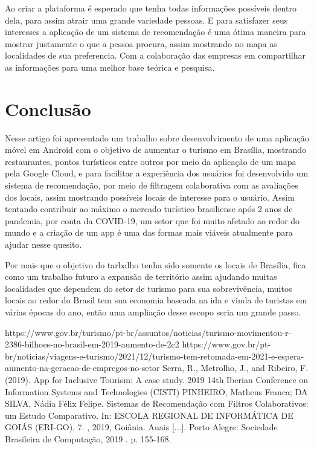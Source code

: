 \documentclass[conference]{IEEEtran}
\begin{document}
Ao criar a plataforma é esperado que tenha todas informações possíveis dentro dela, para assim atrair uma grande variedade pessoas. E para satisfazer seus interesses a aplicação de um sistema de recomendação é uma ótima maneira para mostrar justamente o que a pessoa procura, assim mostrando no mapa as localidades de sua preferencia. Com a colaboração das empresas em compartilhar as informações para uma melhor base teórica e pesquisa.

\section{Conclusão}
Nesse artigo foi apresentado um trabalho sobre desenvolvimento de uma aplicação móvel em Android com o objetivo de aumentar o turismo em Brasília, mostrando restaurantes, pontos turísticos entre outros por meio da aplicação de um mapa pela Google Cloud, e para facilitar a experiência dos usuários foi desenvolvido um sistema de recomendação, por meio de filtragem colaborativa com as avaliações dos locais, assim mostrando possíveis locais de interesse para o usuário. Assim tentando contribuir ao máximo o mercado turístico brasiliense após 2 anos de pandemia, por conta da COVID-19, um setor que foi muito afetado ao redor do mundo e a criação de um app é uma das formas mais viáveis atualmente para ajudar nesse quesito.

Por mais que o objetivo do tarbalho tenha sido somente os locais de Brasília, fica como um trabalho futuro a expansão de território assim ajudando muitas localidades que dependem do setor de turismo para sua sobrevivência, muitos locais ao redor do Brasil tem sua economia baseada na ida e vinda de turistas em várias épocas do ano, então uma ampliação desse escopo seria um grande passo. 

\begin{thebibliography}{00}
 https://www.gov.br/turismo/pt-br/assuntos/noticias/turismo-movimentou-r-2386-bilhoes-no-brasil-em-2019-aumento-de-2c2
 https://www.gov.br/pt-br/noticias/viagens-e-turismo/2021/12/turismo-tem-retomada-em-2021-e-espera-aumento-na-geracao-de-empregos-no-setor
 Serra, R., Metrolho, J., and Ribeiro, F. (2019). App for Inclusive Tourism: A case study. 2019 14th Iberian Conference on Information Systems and Technologies (CISTI)
PINHEIRO, Matheus Franca; DA SILVA, Nádia Félix Felipe. Sistemas de Recomendação com Filtros Colaborativos: um Estudo Comparativo. In: ESCOLA REGIONAL DE INFORMÁTICA DE GOIÁS (ERI-GO), 7. , 2019, Goiânia. Anais [...]. Porto Alegre: Sociedade Brasileira de Computação, 2019 . p. 155-168.
\end{thebibliography}
\end{document}
